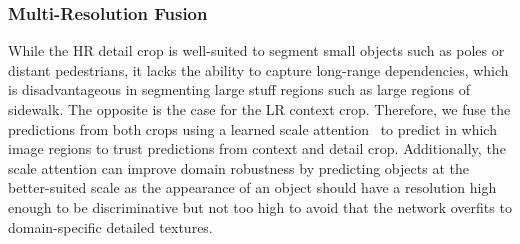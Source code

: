 \documentclass[journal,compsoc]{IEEEtran}
\begin{document}
\subsubsection{Multi-Resolution Fusion}
\label{sec:multi_resolution_uda}

While the HR detail crop is well-suited to segment small objects such as poles or distant pedestrians, it lacks the ability to capture long-range dependencies, which is disadvantageous in segmenting large stuff regions such as large regions of sidewalk. The opposite is the case for the LR context crop. Therefore, we fuse the predictions from both crops using a learned scale attention~\cite{chen2016attention} to predict in which image regions to trust predictions from context and detail crop. 
Additionally, the scale attention can improve domain robustness by predicting objects at the better-suited scale
as the appearance of an object should have a resolution high enough to be discriminative but not too high to avoid that the network overfits to domain-specific detailed textures.
\end{document}
